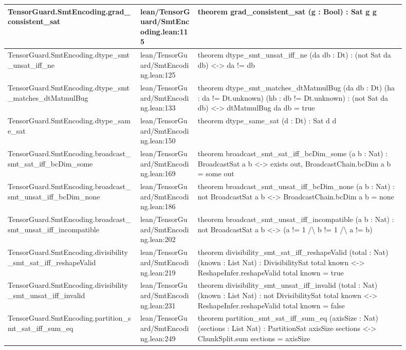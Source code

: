 \documentclass[10pt]{article}
\begin{document}
\begin{longtable}{|p{0.30\linewidth}|p{0.13\linewidth}|p{0.47\linewidth}|}
\hline
TensorGuard.SmtEncoding.grad\_consistent\_sat & lean/TensorGuard/SmtEncoding.lean:115 & theorem grad\_consistent\_sat (g : Bool) : Sat g g \\
\hline
TensorGuard.SmtEncoding.dtype\_smt\_unsat\_iff\_ne & lean/TensorGuard/SmtEncoding.lean:125 & theorem dtype\_smt\_unsat\_iff\_ne (da db : Dt) : (not  Sat da db) <-> da != db \\
\hline
TensorGuard.SmtEncoding.dtype\_smt\_matches\_dtMatmulBug & lean/TensorGuard/SmtEncoding.lean:133 & theorem dtype\_smt\_matches\_dtMatmulBug (da db : Dt) (ha : da != Dt.unknown) (hb : db != Dt.unknown) : (not  Sat da db) <-> dtMatmulBug da db = true \\
\hline
TensorGuard.SmtEncoding.dtype\_same\_sat & lean/TensorGuard/SmtEncoding.lean:150 & theorem dtype\_same\_sat (d : Dt) : Sat d d \\
\hline
TensorGuard.SmtEncoding.broadcast\_smt\_sat\_iff\_bcDim\_some & lean/TensorGuard/SmtEncoding.lean:169 & theorem broadcast\_smt\_sat\_iff\_bcDim\_some (a b : Nat) : BroadcastSat a b <-> exists out, BroadcastChain.bcDim a b = some out \\
\hline
TensorGuard.SmtEncoding.broadcast\_smt\_unsat\_iff\_bcDim\_none & lean/TensorGuard/SmtEncoding.lean:186 & theorem broadcast\_smt\_unsat\_iff\_bcDim\_none (a b : Nat) : not  BroadcastSat a b <-> BroadcastChain.bcDim a b = none \\
\hline
TensorGuard.SmtEncoding.broadcast\_smt\_unsat\_iff\_incompatible & lean/TensorGuard/SmtEncoding.lean:202 & theorem broadcast\_smt\_unsat\_iff\_incompatible (a b : Nat) : not  BroadcastSat a b <-> (a != 1 /\textbackslash{} b != 1 /\textbackslash{} a != b) \\
\hline
TensorGuard.SmtEncoding.divisibility\_smt\_sat\_iff\_reshapeValid & lean/TensorGuard/SmtEncoding.lean:219 & theorem divisibility\_smt\_sat\_iff\_reshapeValid (total : Nat) (known : List Nat) : DivisibilitySat total known <-> ReshapeInfer.reshapeValid total known = true \\
\hline
TensorGuard.SmtEncoding.divisibility\_smt\_unsat\_iff\_invalid & lean/TensorGuard/SmtEncoding.lean:231 & theorem divisibility\_smt\_unsat\_iff\_invalid (total : Nat) (known : List Nat) : not  DivisibilitySat total known <-> ReshapeInfer.reshapeValid total known = false \\
\hline
TensorGuard.SmtEncoding.partition\_smt\_sat\_iff\_sum\_eq & lean/TensorGuard/SmtEncoding.lean:249 & theorem partition\_smt\_sat\_iff\_sum\_eq (axisSize : Nat) (sections : List Nat) : PartitionSat axisSize sections <-> ChunkSplit.sum sections = axisSize \\

\end{longtable}
\end{document}

